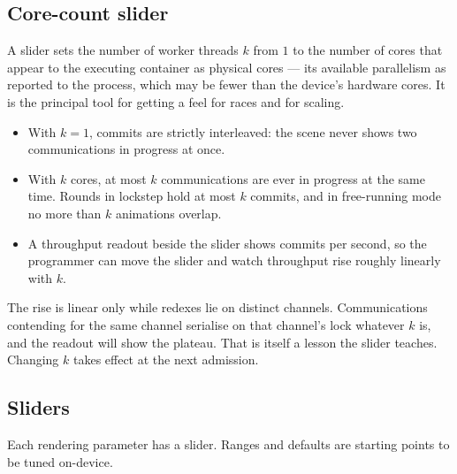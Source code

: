 \documentclass[11pt]{article}
\begin{document}
\subsection{Core-count slider}\label{sec:cores}
A slider sets the number of worker threads $k$ from $1$ to the number of cores that appear to the
executing container as physical cores --- its available parallelism as reported to the process,
which may be fewer than the device's hardware cores. It is the principal tool for getting a feel for races and for scaling.
\begin{itemize}
  \item With $k = 1$, commits are strictly interleaved: the scene never shows two communications
    in progress at once.
  \item With $k$ cores, at most $k$ communications are ever in progress at the same time. Rounds
    in lockstep hold at most $k$ commits, and in free-running mode no more than $k$ animations
    overlap.
  \item A throughput readout beside the slider shows commits per second, so the programmer can
    move the slider and watch throughput rise roughly linearly with $k$.
\end{itemize}
The rise is linear only while redexes lie on distinct channels. Communications contending for
the same channel serialise on that channel's lock whatever $k$ is, and the readout will show
the plateau. That is itself a lesson the slider teaches. Changing $k$ takes effect at the next
admission.

\subsection{Sliders}
Each rendering parameter has a slider. Ranges and defaults are starting points to be
tuned on-device.
\end{document}

